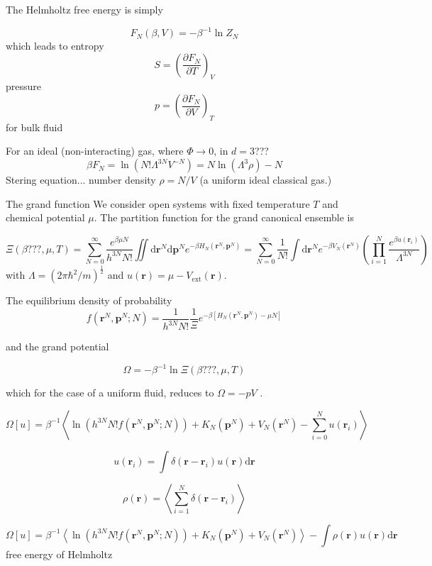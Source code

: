 The Helmholtz free energy is simply

\[
F_{N}(\beta,V)=-\beta^{-1}\ln Z_{N}
\]
which leads to entropy 
\[
S=\left(\dfrac{\partial F_{N}}{\partial T}\right)_{V}
\]
pressure
\[
p=\left(\dfrac{\partial F_{N}}{\partial V}\right)_{T}
\]
for bulk fluid

For an ideal (non-interacting) gas, where $\Phi\rightarrow0$, in
$d=3$???
\[
\beta F_{N}=\ln(N!\Lambda^{3N}V^{-N})=N\ln(\Lambda^{3}\rho)-N
\]
Stering equation... number density $\rho=N/V$ (a uniform ideal classical
gas.)

The grand function We consider open systems with fixed temperature
$T$ and chemical potential $\mu$. The partition function for the
grand canonical ensemble is

\begin{equation}
\Xi(\beta???,\mu,T)=\sum_{N=0}^{\infty}\frac{e^{\beta\mu N}}{h^{3N}N!}\iint\mathrm{d}\mathbf{r}^{N}\mathrm{d}\mathbf{p}^{N}e^{-\beta H_{N}(\mathbf{r}^{N},\mathbf{p}^{N})}=\sum_{N=0}^{\infty}\frac{1}{N!}\int\mathrm{d}\mathbf{r}^{N}e^{-\beta V_{N}(\mathbf{r}^{N})}\left(\prod_{i=1}^{N}\frac{e^{\beta u(\mathbf{r}_{i})}}{\Lambda^{3N}}\right)
\end{equation}
with $\Lambda=(2\pi\hbar^{2}/m)^{\frac{1}{2}}$ and $u(\mathbf{r})=\mu-V_{\mathrm{ext}}(\mathbf{r})$.

The equilibrium density of probability 
\[
f(\mathbf{r}^{N},\mathbf{p}^{N};N)=\frac{1}{h^{3N}N!}\frac{1}{\Xi}e^{-\beta\left[H_{N}(\mathbf{r}^{N},\mathbf{p}^{N})-\mu N\right]}
\]


and the grand potential

\[
\Omega=-\beta^{-1}\ln\Xi(\beta???,\mu,T)
\]


which for the case of a uniform fluid, reduces to $\Omega=-pV$ . 

\[
\Omega\left[u\right]=\beta^{-1}\left\langle \ln\left(h^{3N}N!f(\mathbf{r}^{N},\mathbf{p}^{N};N)\right)+K_{N}(\mathbf{p}^{N})+V_{N}(\mathbf{r}^{N})-\sum_{i=0}^{N}u(\mathbf{r}_{i})\right\rangle 
\]


\[
u(\mathbf{r}_{i})=\int\delta(\mathbf{r}-\mathbf{r}_{i})u(\mathbf{r})\mathrm{d}\mathbf{r}
\]


\[
\rho(\mathbf{r})=\left\langle \sum_{i=1}^{N}\delta(\mathbf{r}-\mathbf{r}_{i})\right\rangle 
\]


\[
\Omega\left[u\right]=\beta^{-1}\left\langle \ln\left(h^{3N}N!f(\mathbf{r}^{N},\mathbf{p}^{N};N)\right)+K_{N}(\mathbf{p}^{N})+V_{N}(\mathbf{r}^{N})\right\rangle -\int\rho(\mathbf{r})u(\mathbf{r})\mathrm{d}\mathbf{r}
\]
free energy of Helmholtz

